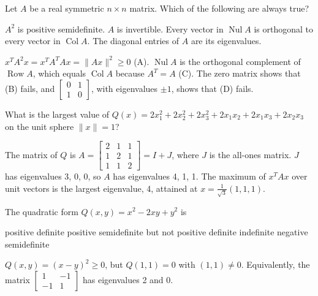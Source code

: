 \begin{question}[id=sym-12, type=msq, marks=2]
Let $A$ be a real symmetric $n \times n$ matrix. Which of the following are always true?
\begin{options}
  \correct $A^2$ is positive semidefinite.
  \option $A$ is invertible.
  \correct Every vector in $\operatorname{Nul} A$ is orthogonal to every vector in $\operatorname{Col} A$.
  \option The diagonal entries of $A$ are its eigenvalues.
\end{options}
\begin{solution}
$x^TA^2x = x^TA^TAx = \|Ax\|^2 \ge 0$ (A). $\operatorname{Nul} A$ is the orthogonal complement of $\operatorname{Row} A$, which equals $\operatorname{Col} A$ because $A^T = A$ (C). The zero matrix shows that (B) fails, and $\begin{bmatrix} 0 & 1 \\ 1 & 0 \end{bmatrix}$, with eigenvalues $\pm 1$, shows that (D) fails.
\end{solution}
\end{question}

\begin{question}[id=sym-13, marks=2]
What is the largest value of $Q(x) = 2x_1^2 + 2x_2^2 + 2x_3^2 + 2x_1x_2 + 2x_1x_3 + 2x_2x_3$ on the unit sphere $\|x\| = 1$?
\begin{solution}
The matrix of $Q$ is $A = \begin{bmatrix} 2 & 1 & 1 \\ 1 & 2 & 1 \\ 1 & 1 & 2 \end{bmatrix} = I + J$, where $J$ is the all-ones matrix. $J$ has eigenvalues 3, 0, 0, so $A$ has eigenvalues 4, 1, 1. The maximum of $x^TAx$ over unit vectors is the largest eigenvalue, 4, attained at $x = \frac{1}{\sqrt{3}}(1, 1, 1)$.
\end{solution}
\end{question}

\begin{question}[id=sym-14]
The quadratic form $Q(x, y) = x^2 - 2xy + y^2$ is
\begin{options}
  \option positive definite
  \correct positive semidefinite but not positive definite
  \option indefinite
  \option negative semidefinite
\end{options}
\begin{solution}
$Q(x, y) = (x - y)^2 \ge 0$, but $Q(1, 1) = 0$ with $(1, 1) \ne 0$. Equivalently, the matrix $\begin{bmatrix} 1 & -1 \\ -1 & 1 \end{bmatrix}$ has eigenvalues 2 and 0.
\end{solution}
\end{question}

